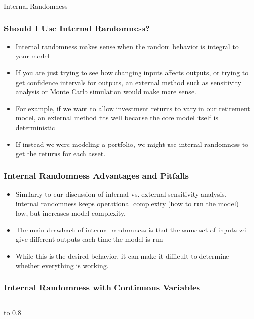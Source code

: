 \documentclass[handout, 11pt]{beamer}
\begin{document}
\begin{section}{Internal Randomness}
\begin{frame}
\begin{center}
\begin{adjustbox}{width=0.9\textwidth, height=0.8\textheight, keepaspectratio}
\begin{tikzpicture}
\end{tikzpicture}
\end{adjustbox}
\end{center}
\end{frame}
\begin{frame}
\frametitle{Should I Use Internal Randomness?}
\begin{itemize}
\item Internal randomness makes sense when the random behavior is integral to your model
\vfill
\item If you are just trying to see how changing inputs affects outputs, or trying to get confidence intervals for outputs, an external method such as sensitivity analysis or Monte Carlo simulation would make more sense.
\vfill
\item For example, if we want to allow investment returns to vary in our retirement model, an external method fits well because the core model itself is deterministic
\vfill
\item If instead we were modeling a portfolio, we might use internal randomness to get the returns for each asset.
\end{itemize}
\end{frame}
\begin{frame}
\frametitle{Internal Randomness Advantages and Pitfalls}
\begin{itemize}
\item Similarly to our discussion of internal vs. external sensitivity analysis, internal randomness keeps operational complexity (how to run the model) low, but increases model complexity.
\vfill
\item The main drawback of internal randomness is that the same set of inputs will give different outputs each time the model is run
\vfill
\item While this is the desired behavior, it can make it difficult to determine whether everything is working.
\end{itemize}
\end{frame}
\begin{frame}
\frametitle{Internal Randomness with Continuous Variables}
\begin{columns}
\begin{column}{0.5\textwidth}
\vbox to 0.8
\end{column}
\end{columns}
\end{frame}
\end{section}
\end{document}
